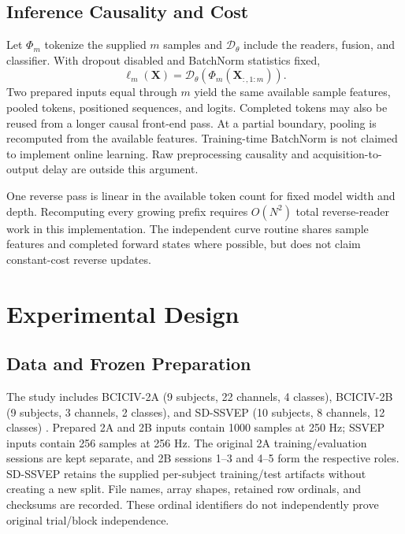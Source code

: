 \documentclass[conference]{IEEEtran}
\begin{document}
\subsection{Inference Causality and Cost}
Let $\Phi_m$ tokenize the supplied $m$ samples and $\mathcal D_\theta$
include the readers, fusion, and classifier. With dropout disabled and
BatchNorm statistics fixed,
\begin{equation}
\boldsymbol\ell_m(\mathbf X)=\mathcal D_\theta(\Phi_m(\mathbf X_{:,1:m})).
\end{equation}
Two prepared inputs equal through $m$ yield the same available sample
features, pooled tokens, positioned sequences, and logits. Completed tokens
may also be reused from a longer causal front-end pass. At a partial boundary,
pooling is recomputed from the available features. Training-time BatchNorm is
not claimed to implement online learning. Raw preprocessing causality and
acquisition-to-output delay are outside this argument.

One reverse pass is linear in the available token count for fixed model width
and depth. Recomputing every growing prefix requires $O(N^2)$ total
reverse-reader work in this implementation. The independent curve routine
shares sample features and completed forward states where possible, but does
not claim constant-cost reverse updates.

\section{Experimental Design}
\subsection{Data and Frozen Preparation}
The study includes BCICIV-2A (9 subjects, 22 channels, 4 classes), BCICIV-2B
(9 subjects, 3 channels, 2 classes), and SD-SSVEP (10 subjects, 8 channels,
12 classes) \cite{tangermann2012review,nakanishi2015comparison}.
Prepared 2A and 2B inputs contain 1000 samples at 250 Hz; SSVEP inputs contain
256 samples at 256 Hz. The original 2A training/evaluation sessions are kept
separate, and 2B sessions 1--3 and 4--5 form the respective roles.
SD-SSVEP retains the supplied per-subject training/test artifacts without
creating a new split. File names, array shapes, retained row ordinals, and
checksums are recorded. These ordinal identifiers do not independently prove
original trial/block independence.
\end{document}

